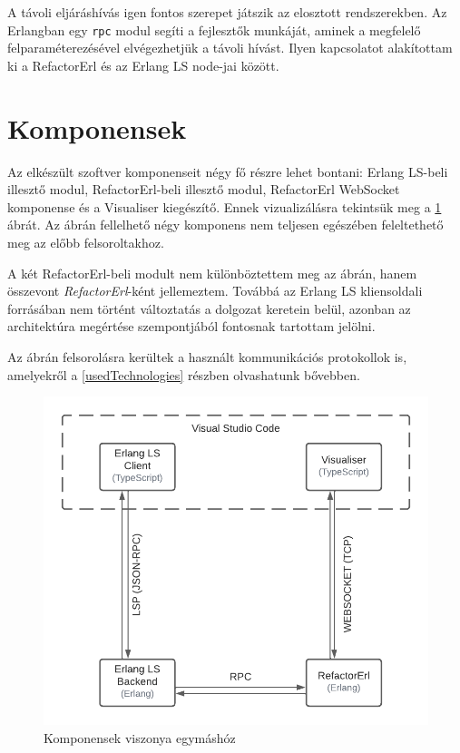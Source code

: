A távoli eljáráshívás igen fontos szerepet játszik az elosztott rendszerekben. Az Erlangban egy \lstinline{rpc} modul segíti a fejlesztők munkáját, aminek a megfelelő felparaméterezésével elvégezhetjük a távoli hívást. Ilyen kapcsolatot alakítottam ki a RefactorErl és az Erlang LS node-jai között.



\section{Komponensek}

Az elkészült szoftver komponenseit négy fő részre lehet bontani: Erlang LS-beli illesztő modul, RefactorErl-beli illesztő modul, RefactorErl WebSocket komponense és a Visualiser kiegészítő. Ennek vizualizálásra tekintsük meg a \ref{fig:architecture} ábrát. Az ábrán fellelhető négy komponens nem teljesen egészében feleltethető meg az előbb felsoroltakhoz.

A két RefactorErl-beli modult nem különböztettem meg az ábrán, hanem összevont \textit{RefactorErl}-ként jellemeztem. Továbbá az Erlang LS kliensoldali forrásában nem történt változtatás a dolgozat keretein belül, azonban az architektúra megértése szempontjából fontosnak tartottam jelölni.

Az ábrán felsorolásra kerültek a használt kommunikációs protokollok is, amelyekről a \ref{usedTechnologies} részben olvashatunk bővebben.

\begin{figure}[H]
  \centering
  \includegraphics[width=0.8\linewidth]{images/architecture.png}
  \caption{Komponensek viszonya egymáshóz}
  \label{fig:architecture}
\end{figure}

